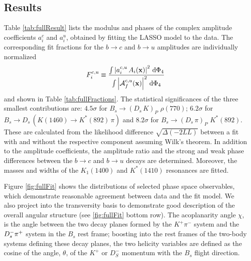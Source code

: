 \clearpage
\subsection{Results}

Table \ref{tab:fullResult} 
lists the modulus and phases of the complex amplitude coefficients $a^c_{i}$ and $a^u_{i}$, 
obtained by fitting the LASSO model to the data.
The corresponding fit fractions for the $b\to c$ and $b\to u$ amplitudes are individually normalized
\begin{equation}
\label{eq:DefineFitFractions}
	F^{c,u}_{i} \equiv \frac{\int \left\vert   a_{i}^{c,u} \, A_{i}(\mathbf{x}) \right\vert^{2} \, \text{d}\Phi_{4} }
	{\int \left\vert  \mathcal A_f^{c,u}(\mathbf{x}) \right\vert^{2} \, \text{d}\Phi_{4}}  
\end{equation}
and shown in Table \ref{tab:fullFractions}.
The statistical significances
 of the three smallest contributions are:
 $4.5\sigma$ for $B_s \to ( D_s \, K)_{P} \, \, \rho(770)$;
 $6.2\sigma$ for $B_s \to D_s \, ( K(1460) \to K^{*}(892) \, \pi )$
 and $8.2\sigma$
for $B_s \to ( D_s \, \pi)_{P} \, \, K^{*}(892)$.
These are calculated from the likelihood difference $\sqrt{\Delta(-2LL)}$ between a fit with and without the respective component assuming Wilk's theorem.
In addition to the amplitude coefficients, the amplitude ratio and the strong and weak phase differences between the $b\to c$ and $b\to u$ decays are determined.
Moreover, the masses and widths of the $K_1(1400)$ and $K^{*}(1410)$ resonances are fitted.

Figure \ref{fig:fullFit} shows the distributions of 
selected phase space observables, which demonstrate 
reasonable agreement between data and the fit model. 
We also project into the transversity basis to demonstrate good description of the overall angular structure (see \ref{fig:fullFit} bottom row).
The acoplanarity angle 
${\chi}$, is the angle between the two decay planes formed by 
the $K^+\pi^-$ system and the $D_s^- {{\pi}^+}$ system
in the $B_s$ rest frame; boosting into the rest frames of the two-body systems defining these decay planes,
the two helicity variables 
are defined as the cosine of the angle, ${\theta}$, 
of the $K^+$ or $D_S^-$ momentum with the $B_s$ flight direction.

